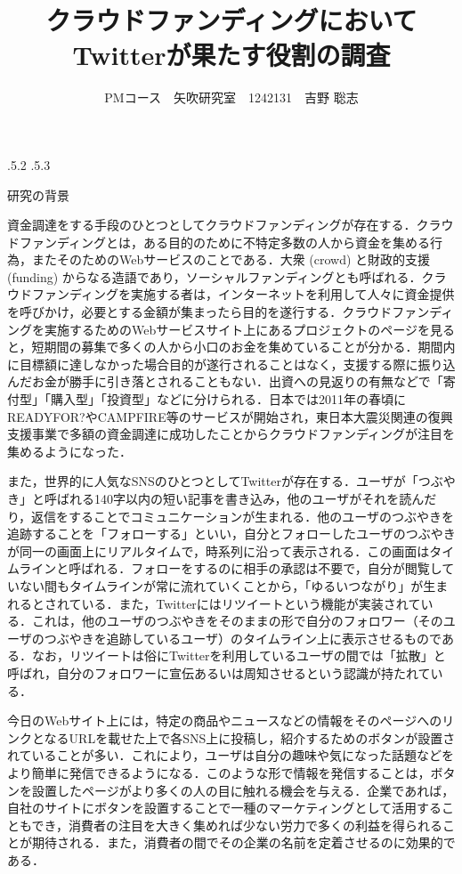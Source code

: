 \documentclass[uplatex]{jsarticle}
\title{\vspace{-14mm}クラウドファンディングにおいてTwitterが果たす役割の調査}
\author{PMコース　矢吹研究室　1242131　吉野 聡志}
\date{}%
\makeatletter
\renewcommand{\section}{%
    \if@slide\clearpage\fi
    \@startsection{section}{1}{\z@}%
    {\Cvs \@plus.5\Cdp \@minus.2\Cdp}%
    {.5\Cvs \@plus.3\Cdp}%
    {\normalfont\raggedright}}
\makeatother
\begin{document}
\maketitle





\section{研究の背景}

資金調達をする手段のひとつとしてクラウドファンディングが存在する．クラウドファンディングとは，ある目的のために不特定多数の人から資金を集める行為，またそのためのWebサービスのことである．大衆 (crowd) と財政的支援 (funding) からなる造語であり，ソーシャルファンディングとも呼ばれる．クラウドファンディングを実施する者は，インターネットを利用して人々に資金提供を呼びかけ，必要とする金額が集まったら目的を遂行する．クラウドファンディングを実施するためのWebサービスサイト上にあるプロジェクトのページを見ると，短期間の募集で多くの人から小口のお金を集めていることが分かる．期間内に目標額に達しなかった場合目的が遂行されることはなく，支援する際に振り込んだお金が勝手に引き落とされることもない．出資への見返りの有無などで「寄付型」「購入型」「投資型」などに分けられる．日本では2011年の春頃にREADYFOR?やCAMPFIRE等のサービスが開始され，東日本大震災関連の復興支援事業で多額の資金調達に成功したことからクラウドファンディングが注目を集めるようになった．

また，世界的に人気なSNSのひとつとしてTwitterが存在する．ユーザが「つぶやき」と呼ばれる140字以内の短い記事を書き込み，他のユーザがそれを読んだり，返信をすることでコミュニケーションが生まれる．他のユーザのつぶやきを追跡することを「フォローする」といい，自分とフォローしたユーザのつぶやきが同一の画面上にリアルタイムで，時系列に沿って表示される．この画面はタイムラインと呼ばれる．フォローをするのに相手の承認は不要で，自分が閲覧していない間もタイムラインが常に流れていくことから，「ゆるいつながり」が生まれるとされている．また，Twitterにはリツイートという機能が実装されている．これは，他のユーザのつぶやきをそのままの形で自分のフォロワー（そのユーザのつぶやきを追跡しているユーザ）のタイムライン上に表示させるものである．なお，リツイートは俗にTwitterを利用しているユーザの間では「拡散」と呼ばれ，自分のフォロワーに宣伝あるいは周知させるという認識が持たれている．

今日のWebサイト上には，特定の商品やニュースなどの情報をそのページへのリンクとなるURLを載せた上で各SNS上に投稿し，紹介するためのボタンが設置されていることが多い．これにより，ユーザは自分の趣味や気になった話題などをより簡単に発信できるようになる．このような形で情報を発信することは，ボタンを設置したページがより多くの人の目に触れる機会を与える．企業であれば，自社のサイトにボタンを設置することで一種のマーケティングとして活用することもでき，消費者の注目を大きく集めれば少ない労力で多くの利益を得られることが期待される．また，消費者の間でその企業の名前を定着させるのに効果的である．
\end{document}
